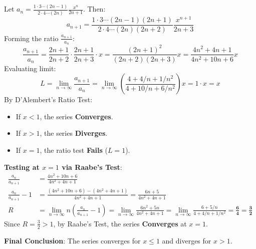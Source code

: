 \begin{solutionbox}
Let $a_n = \frac{1 \cdot 3 \cdots (2n-1)}{2 \cdot 4 \cdots (2n)} \frac{x^n}{2n+1}$. Then:
\begin{equation*}
    a_{n+1} = \frac{1 \cdot 3 \cdots (2n-1)(2n+1)}{2 \cdot 4 \cdots (2n)(2n+2)} \frac{x^{n+1}}{2n+3}
\end{equation*}
Forming the ratio $\frac{a_{n+1}}{a_n}$:
\begin{equation*}
    \frac{a_{n+1}}{a_n} = \frac{2n+1}{2n+2} \cdot \frac{2n+1}{2n+3} \cdot x = \frac{(2n+1)^2}{(2n+2)(2n+3)} x = \frac{4n^2 + 4n + 1}{4n^2 + 10n + 6} x
\end{equation*}
Evaluating limit:
\begin{equation*}
    L = \lim_{n\to\infty} \frac{a_{n+1}}{a_n} = \lim_{n\to\infty} \left(\frac{4 + 4/n + 1/n^2}{4 + 10/n + 6/n^2}\right) x = 1 \cdot x = x
\end{equation*}
By D'Alembert's Ratio Test:
\begin{itemize}
    \item If $x < 1$, the series \textbf{Converges}.
    \item If $x > 1$, the series \textbf{Diverges}.
    \item If $x = 1$, the ratio test \textbf{Fails} ($L = 1$).
\end{itemize}

\textbf{Testing at $x = 1$ via Raabe's Test}:
\begin{align*}
    \frac{a_n}{a_{n+1}} &= \frac{4n^2 + 10n + 6}{4n^2 + 4n + 1} \\
    \frac{a_n}{a_{n+1}} - 1 &= \frac{(4n^2 + 10n + 6) - (4n^2 + 4n + 1)}{4n^2 + 4n + 1} = \frac{6n + 5}{4n^2 + 4n + 1} \\
    R &= \lim_{n\to\infty} n \left( \frac{a_n}{a_{n+1}} - 1 \right) = \lim_{n\to\infty} \frac{6n^2 + 5n}{4n^2 + 4n + 1} = \lim_{n\to\infty} \frac{6 + 5/n}{4 + 4/n + 1/n^2} = \mathbf{\frac{6}{4} = \frac{3}{2}}
\end{align*}
Since $R = \frac{3}{2} > 1$, by Raabe's Test, the series \textbf{Converges} at $x = 1$.

\textbf{Final Conclusion}: The series converges for $x \le 1$ and diverges for $x > 1$.
\end{solutionbox}

